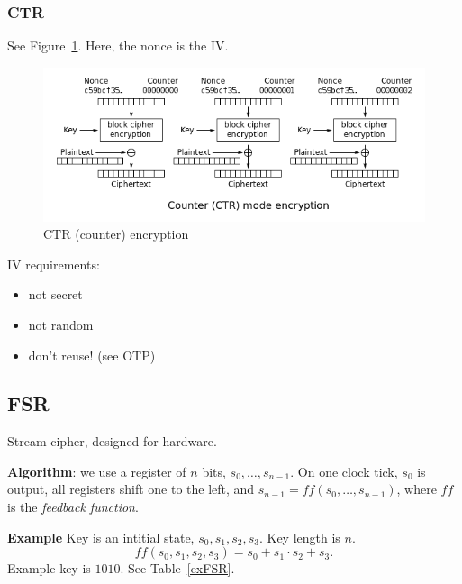 \documentclass[language=english,number=]{homework}
\begin{document}
\subsubsection{CTR}

See Figure~\ref{ctr}.
Here, the nonce is the IV.

\begin{figure}
\centering
\includegraphics[width=\textwidth]{ctr.PNG}
\caption{CTR (counter) encryption}
\label{ctr}
\end{figure}

IV requirements:
\begin{itemize}
\item not secret
\item not random
\item don't reuse! (see OTP)
\end{itemize}

\subsection{FSR}

Stream cipher, designed for hardware.

\textbf{Algorithm}: we use a register of $n$ bits, $s_0, \dots, s_{n-1}$.
On one clock tick, $s_0$ is output, all registers shift one to the left, and $s_{n-1} = ff(s_0, \dots, s_{n-1})$, where $ff$ is the \textit{feedback function}.

\textbf{Example}
Key is an intitial state, $s_0, s_1, s_2, s_3$.
Key length is $n$.
\[
ff(s_0, s_1, s_2, s_3) = s_0 + s_1 \cdot s_2 + s_3.
\]
Example key is $1010$.
See Table~\ref{exFSR}.
\end{document}
